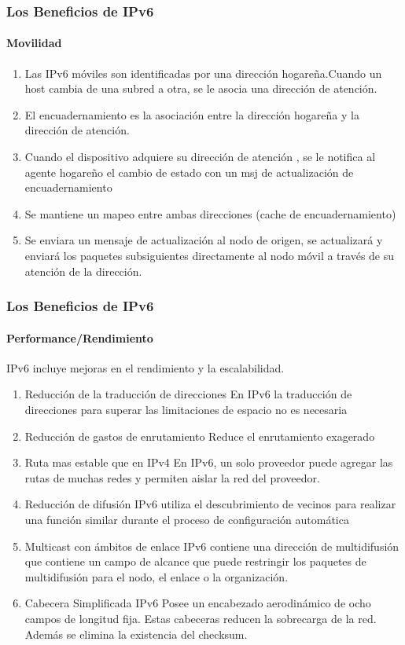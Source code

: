 \documentclass{beamer}
\begin{document}
\begin{frame}
\frametitle{Los Beneficios de IPv6}
\framesubtitle{Movilidad}
\begin{enumerate}
\item Las  IPv6 móviles son identificadas por una dirección hogareña.Cuando un host cambia de una subred a otra, se le asocia una dirección de atención.
\item El encuadernamiento es la asociación entre la dirección hogareña y la dirección de atención.
\item Cuando el dispositivo adquiere su dirección de atención , se le notifica al agente hogareño el cambio de estado con un msj de actualización de encuadernamiento
\item Se mantiene un mapeo entre ambas direcciones (cache de encuadernamiento)  
 \item Se enviara un mensaje 
de actualización al nodo de origen, se actualizará y enviará los paquetes subsiguientes directamente 
al nodo móvil a través de su atención  de la dirección.
\end{enumerate}
\end{frame}

\begin{frame}
\frametitle{Los Beneficios de IPv6}
\framesubtitle{Performance/Rendimiento}

IPv6 incluye mejoras en el rendimiento y la escalabilidad.
\begin{enumerate}
\item Reducción de la traducción de direcciones En IPv6 la traducción de direcciones para superar 
las limitaciones de espacio no es necesaria
\item Reducción de gastos de enrutamiento  Reduce el enrutamiento exagerado
\item Ruta mas estable que  en IPv4 En IPv6, un solo proveedor puede agregar las rutas de muchas redes y permiten 
aislar la red del proveedor.
\item  Reducción de difusión IPv6  utiliza el descubrimiento de vecinos para realizar una función 
similar durante el proceso de configuración automática
 \item Multicast con ámbitos de enlace IPv6 contiene una dirección de multidifusión que contiene un 
campo de alcance que puede restringir los paquetes de multidifusión para el nodo, el enlace o la 
organización.
\item Cabecera Simplificada IPv6 Posee un encabezado aerodinámico de ocho campos de longitud 
fija. Estas cabeceras reducen la sobrecarga de la red. Además se elimina la existencia del checksum.

\end{enumerate}
\end{frame}
\end{document}
